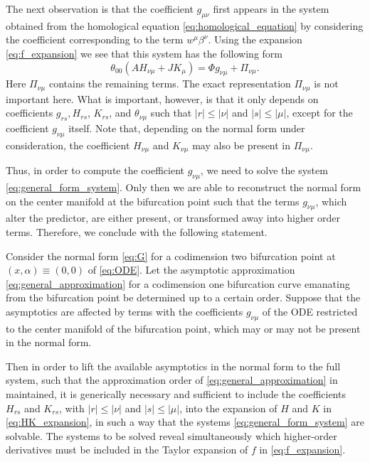 The next observation is that the coefficient $g_{\mu\nu}$ first appears in the
system obtained from the homological equation \cref{eq:homological_equation} by
considering the coefficient corresponding to the term $w^\mu\beta^\nu$.
Using the expansion \cref{eq:f_expansion} we see that this system has the
following form
\begin{equation}
    \label{eq:general_form_system}
    \theta_{00} (A H_{\nu\mu} + J K_\mu) = \Phi g_{\nu\mu} + \Pi_{\nu\mu}.
\end{equation}
Here $\Pi_{\nu\mu}$ contains the remaining terms. The exact representation
$\Pi_{\nu\mu}$  is not important here. What is important, however, is that it
only depends on coefficients $g_{rs}, H_{rs}$, $K_{rs}$, and $\theta_{\nu\mu}$ such
that $|r| \leq |\nu|$ and $|s| \leq |\mu|$, except for the
coefficient $g_{\nu\mu}$ itself. Note that, depending on the normal form under
consideration, the coefficient $H_{\nu\mu}$ and $K_{\nu\mu}$ may also be
present in $\Pi_{\nu\mu}$. 

Thus, in order to compute the coefficient $g_{\nu\mu}$, we need to solve the
system \cref{eq:general_form_system}. Only then we are able to reconstruct the
normal form on the center manifold at the bifurcation point such that the terms
$g_{\nu\mu}$, which alter the predictor, are either present, or transformed
away into higher order terms. Therefore, we conclude with the following
statement.

\begin{proposition}
\label{thm:coefficients}
Consider the normal form \cref{eq:G} for a codimension two bifurcation point at
$(x,\alpha) \equiv (0,0)$ of \cref{eq:ODE}. Let the asymptotic approximation 
\cref{eq:general_approximation} for a codimension one bifurcation curve
emanating from the bifurcation point be determined up to a certain order.
Suppose that the asymptotics are affected by terms with the coefficients
$g_{\nu\mu}$ of the ODE restricted to the center manifold of the bifurcation
point, which may or may not be present in the normal form. 

Then in order to
lift the available asymptotics in the normal form to the full system, such that
the approximation order of \cref{eq:general_approximation} in maintained, it is
generically necessary and sufficient to include the coefficients $H_{rs}$ and $K_{rs}$,
with $|r| \leq |\nu|$ and $|s| \leq |\mu|$, into the expansion of $H$ and $K$
in \cref{eq:HK_expansion}, in such a way that the systems
\cref{eq:general_form_system} are solvable. The systems to be solved reveal
simultaneously which higher-order derivatives must be included in the Taylor
expansion of $f$ in \cref{eq:f_expansion}.
\end{proposition}

